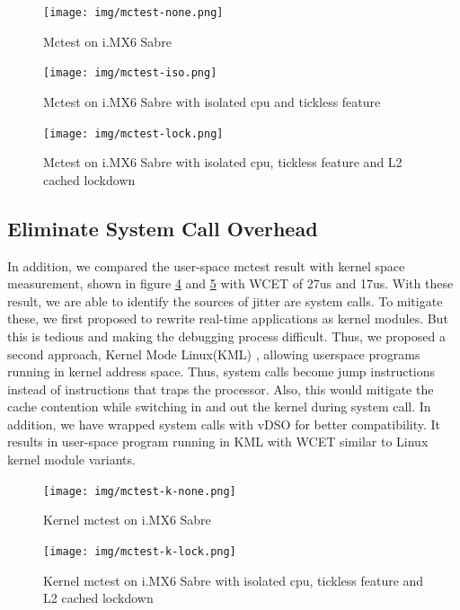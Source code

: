 \documentclass[conference]{IEEEtran}
\begin{document}
    \begin{figure} \centering \texttt{[image: img/mctest-none.png]} \caption{Mctest on i.MX6 Sabre}
    \label{fig:imx6_mctest_v} \end{figure}
    
    \begin{figure} \centering \texttt{[image: img/mctest-iso.png]} \caption{Mctest on i.MX6 Sabre with
    isolated cpu and tickless feature} \label{fig:imx6_mctest_iso} \end{figure}
    
    \begin{figure} \centering \texttt{[image: img/mctest-lock.png]} \caption{Mctest on i.MX6 Sabre with
    isolated cpu, tickless feature and L2 cached lockdown} \label{fig:imx6_mctest_lock} \end{figure}
    
    \subsection{Eliminate System Call Overhead}

    In addition, we compared the user-space mctest result with kernel space measurement, shown in figure
    \ref{fig:imx6_mctest_k_v} and \ref{fig:imx6_mctest_k_lock} with WCET of 27us and 17us. With these result, we are
    able to identify the sources of jitter are system calls. To mitigate these, we first proposed to rewrite real-time
    applications as kernel modules. But this is tedious and making the debugging process difficult. Thus, we proposed a
    second approach, Kernel Mode Linux(KML) \cite{KML} \cite{KMLConf}, allowing userspace programs running in kernel
    address space. Thus, system calls become jump instructions instead of instructions that traps the processor. Also,
    this would mitigate the cache contention while switching in and out the kernel during system call.
    In addition, we have wrapped system calls with vDSO \cite{vDSO} for better compatibility. It results in
    user-space program running in KML with WCET similar to Linux kernel module variants.

    \begin{figure} \centering \texttt{[image: img/mctest-k-none.png]} \caption{Kernel mctest on i.MX6 Sabre}
    \label{fig:imx6_mctest_k_v} \end{figure}
    
    \begin{figure} \centering \texttt{[image: img/mctest-k-lock.png]} \caption{Kernel mctest on i.MX6 Sabre
    with isolated cpu, tickless feature and L2 cached lockdown} \label{fig:imx6_mctest_k_lock} \end{figure}
    
\end{document}
